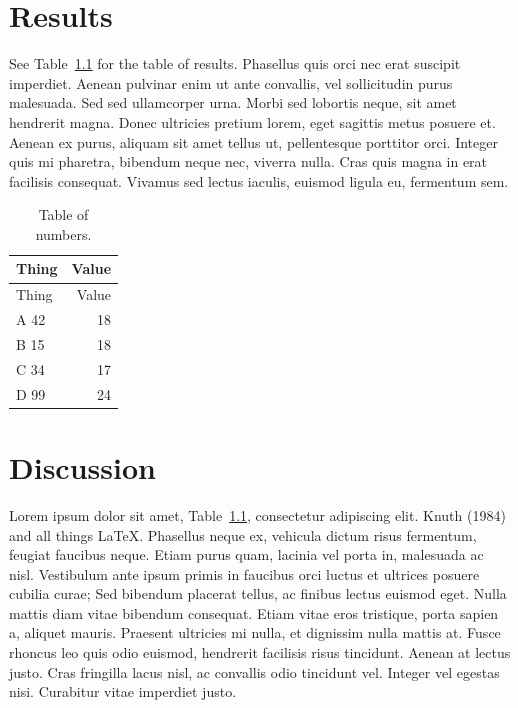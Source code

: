 \documentclass[
  oneside,
  open=any]{scrbook}
\begin{document}
\hypertarget{results}{%
\chapter{Results}\label{results}}

See Table~\ref{tbl-numbers} for the table of results. Phasellus quis
orci nec erat suscipit imperdiet. Aenean pulvinar enim ut ante
convallis, vel sollicitudin purus malesuada. Sed sed ullamcorper urna.
Morbi sed lobortis neque, sit amet hendrerit magna. Donec ultricies
pretium lorem, eget sagittis metus posuere et. Aenean ex purus, aliquam
sit amet tellus ut, pellentesque porttitor orci. Integer quis mi
pharetra, bibendum neque nec, viverra nulla. Cras quis magna in erat
facilisis consequat. Vivamus sed lectus iaculis, euismod ligula eu,
fermentum sem.

\hypertarget{tbl-numbers}{}
\begin{longtable}[]{@{}lr@{}}
\caption{\label{tbl-numbers}Table of numbers.}\tabularnewline
\toprule\noalign{}
Thing & Value \\
\midrule\noalign{}
\endfirsthead
\toprule\noalign{}
Thing & Value \\
\midrule\noalign{}
\endhead
\bottomrule\noalign{}
\endlastfoot
A 42 & 18 \\
B 15 & 18 \\
C 34 & 17 \\
D 99 & 24 \\
\end{longtable}

\hypertarget{discussion}{%
\chapter{Discussion}\label{discussion}}

Lorem ipsum dolor sit amet, Table~\ref{tbl-numbers}, consectetur
adipiscing elit. Knuth (1984) and all things LaTeX. Phasellus neque ex,
vehicula dictum risus fermentum, feugiat faucibus neque. Etiam purus
quam, lacinia vel porta in, malesuada ac nisl. Vestibulum ante ipsum
primis in faucibus orci luctus et ultrices posuere cubilia curae; Sed
bibendum placerat tellus, ac finibus lectus euismod eget. Nulla mattis
diam vitae bibendum consequat. Etiam vitae eros tristique, porta sapien
a, aliquet mauris. Praesent ultricies mi nulla, et dignissim nulla
mattis at. Fusce rhoncus leo quis odio euismod, hendrerit facilisis
risus tincidunt. Aenean at lectus justo. Cras fringilla lacus nisl, ac
convallis odio tincidunt vel. Integer vel egestas nisi. Curabitur vitae
imperdiet justo.
\end{document}
